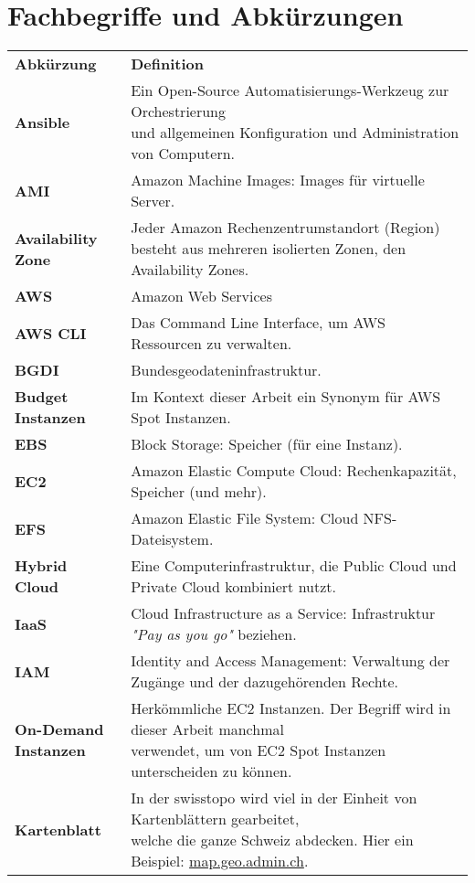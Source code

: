 \section{Fachbegriffe und Abkürzungen}
\begin{table}[!htbp]
\begin{tabular}{p{}p{}}
    \textbf{Abkürzung} & \textbf{Definition}\\
    \textbf{Ansible} & \makecell[l]{Ein Open-Source Automatisierungs-Werkzeug zur Orchestrierung\\ und allgemeinen Konfiguration und Administration von Computern.}\\
    \textbf{AMI} & Amazon Machine Images: Images für virtuelle Server.\\
    \textbf{Availability Zone} & \makecell[l]{Jeder Amazon Rechenzentrumstandort (Region)\\
    besteht aus mehreren isolierten Zonen, den Availability Zones.}\\
    \textbf{AWS} & Amazon Web Services\\
    \textbf{AWS CLI} & Das Command Line Interface, um AWS Ressourcen zu verwalten.\\
    \textbf{BGDI} & Bundesgeodateninfrastruktur.\\
    \textbf{Budget Instanzen} & Im Kontext dieser Arbeit ein Synonym für AWS Spot Instanzen.\\
    \textbf{EBS} & Block Storage: Speicher (für eine Instanz).\\
    \textbf{EC2} & Amazon Elastic Compute Cloud: Rechenkapazität, Speicher (und mehr).\\
    \textbf{EFS} & Amazon Elastic File System: Cloud NFS-Dateisystem.\\
    \textbf{Hybrid Cloud} & Eine Computerinfrastruktur, die Public Cloud und Private Cloud kombiniert nutzt.\\
    \textbf{IaaS} & Cloud Infrastructure as a Service: Infrastruktur \emph{"Pay as you go"} beziehen.\\
    \textbf{IAM} & Identity and Access Management: Verwaltung der Zugänge und der dazugehörenden Rechte.\\
    \makecell[l]{\textbf{On-Demand}\\ \textbf{Instanzen}} & \makecell[l]{Herkömmliche EC2 Instanzen. Der Begriff wird in dieser Arbeit manchmal\\ verwendet, um von EC2 Spot Instanzen unterscheiden zu können.}\\
    \textbf{Kartenblatt} & \makecell[l]{In der swisstopo wird viel in der Einheit von Kartenblättern gearbeitet,\\ welche die ganze Schweiz abdecken. Hier ein Beispiel: \href{https://s.geo.admin.ch/8b5f3f6721}{map.geo.admin.ch}.}\\

\end{tabular}
\end{table}
